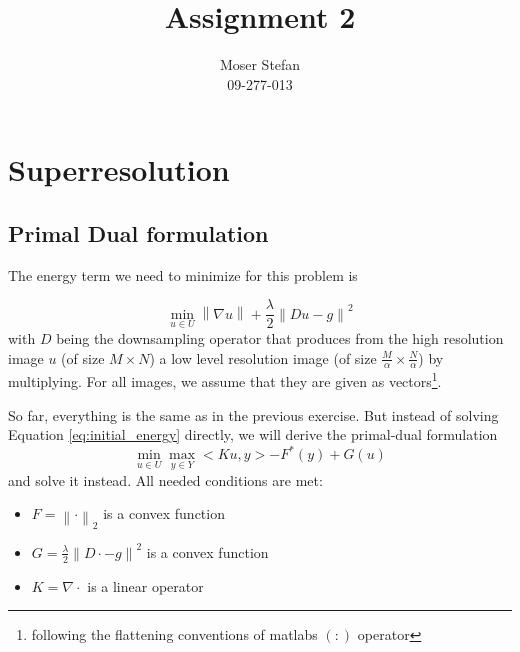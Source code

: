 \documentclass{paper}
\title{Assignment 2}
\author{Moser Stefan\\09-277-013}
\newcommand{\norm}[1]{\left\lVert#1\right\rVert}
\begin{document}
\maketitle


%

\section*{Superresolution}

\subsection*{Primal Dual formulation}
The energy term we need to minimize for this problem is

\begin{equation}
\min_{u \in U} \norm{\nabla u} + \frac{\lambda}{2} \norm{Du - g}^2
\label{eq:initial_energy}
\end{equation}
with $D$ being the downsampling operator that produces from the high 
resolution image $u$ (of size $M \times N$) a low level resolution image
(of size $\frac{M}{\alpha} \times \frac{N}{\alpha}$) by multiplying. 
For all images, we assume that they are given as vectors\footnote{following the flattening conventions of matlabs $(:)$ operator}.

So far, everything is the same as in the previous exercise. But instead of
solving Equation \eqref{eq:initial_energy} directly, we will derive the primal-dual
formulation
\begin{equation}
\min_{u \in U} \max_{y \in Y} < Ku, y > - F^*(y) + G(u)
\label{eq:dual_energy}
\end{equation}
and solve it instead. All needed conditions are met:
\begin{itemize}
\item $F = \norm{\cdot}_2$ is a convex function
\item $G = \frac{\lambda}{2}\norm{ D\cdot - g}^2$ is a convex function
\item $K = \nabla \cdot$ is a linear operator
\end{itemize}
\end{document}
